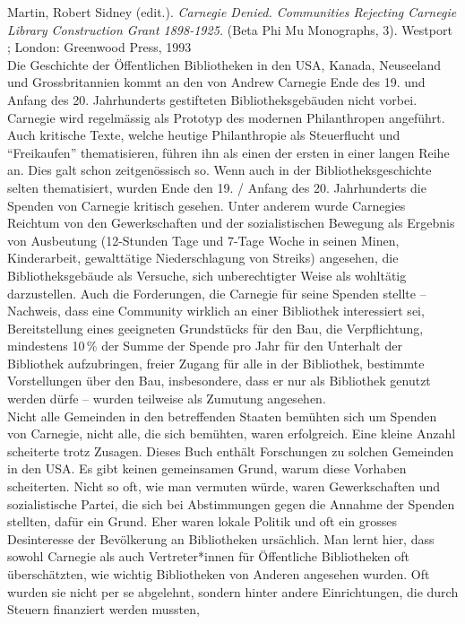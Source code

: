 \documentclass[a4paper,
fontsize=11pt,
oneside,
numbers=noperiodatend,
parskip=half-,
bibliography=totoc,
final
]{scrartcl}
\begin{document}
Martin, Robert Sidney (edit.). \emph{Carnegie Denied. Communities
Rejecting Carnegie Library Construction Grant 1898-1925.} (Beta Phi Mu
Monographs, 3). Westport ; London: Greenwood Press, 1993\\
Die Geschichte der Öffentlichen Bibliotheken in den USA, Kanada,
Neuseeland und Grossbritannien kommt an den von Andrew Carnegie Ende des
19. und Anfang des 20. Jahrhunderts gestifteten Bibliotheksgebäuden
nicht vorbei. Carnegie wird regelmässig als Prototyp des modernen
Philanthropen angeführt. Auch kritische Texte, welche heutige
Philanthropie als Steuerflucht und ``Freikaufen'' thematisieren, führen
ihn als einen der ersten in einer langen Reihe an. Dies galt schon
zeitgenössisch so. Wenn auch in der Bibliotheksgeschichte selten
thematisiert, wurden Ende den 19. / Anfang des 20. Jahrhunderts die
Spenden von Carnegie kritisch gesehen. Unter anderem wurde Carnegies
Reichtum von den Gewerkschaften und der sozialistischen Bewegung als
Ergebnis von Ausbeutung (12-Stunden Tage und 7-Tage Woche in seinen
Minen, Kinderarbeit, gewalttätige Niederschlagung von Streiks)
angesehen, die Bibliotheksgebäude als Versuche, sich unberechtigter
Weise als wohltätig darzustellen. Auch die Forderungen, die Carnegie für
seine Spenden stellte -- Nachweis, dass eine Community wirklich an einer
Bibliothek interessiert sei, Bereitstellung eines geeigneten Grundstücks
für den Bau, die Verpflichtung, mindestens 10\,\% der Summe der Spende
pro Jahr für den Unterhalt der Bibliothek aufzubringen, freier Zugang
für alle in der Bibliothek, bestimmte Vorstellungen über den Bau,
insbesondere, dass er nur als Bibliothek genutzt werden dürfe -- wurden
teilweise als Zumutung angesehen.\\
Nicht alle Gemeinden in den betreffenden Staaten bemühten sich um
Spenden von Carnegie, nicht alle, die sich bemühten, waren erfolgreich.
Eine kleine Anzahl scheiterte trotz Zusagen. Dieses Buch enthält
Forschungen zu solchen Gemeinden in den USA. Es gibt keinen gemeinsamen
Grund, warum diese Vorhaben scheiterten. Nicht so oft, wie man vermuten
würde, waren Gewerkschaften und sozialistische Partei, die sich bei
Abstimmungen gegen die Annahme der Spenden stellten, dafür ein Grund.
Eher waren lokale Politik und oft ein grosses Desinteresse der
Bevölkerung an Bibliotheken ursächlich. Man lernt hier, dass sowohl
Carnegie als auch Vertreter*innen für Öffentliche Bibliotheken oft
überschätzten, wie wichtig Bibliotheken von Anderen angesehen wurden.
Oft wurden sie nicht per se abgelehnt, sondern hinter andere
Einrichtungen, die durch Steuern finanziert werden mussten,
\end{document}
